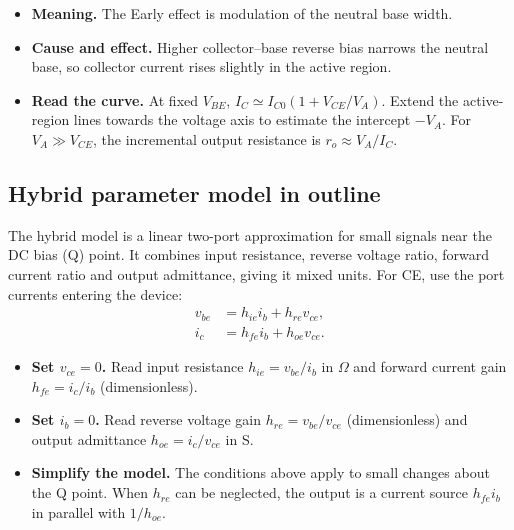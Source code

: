 \documentclass[12pt,a4paper]{article}
\begin{document}
\begin{tcolorbox}[tikzbox,title={CE output characteristics and the Early effect},unbreakable]
\centering
{}
\end{tcolorbox}

\begin{itemize}[leftmargin=*, itemsep=3pt, topsep=4pt]
  \item \textbf{Meaning.} The Early effect is modulation of the neutral base width.
  \item \textbf{Cause and effect.} Higher collector--base reverse bias narrows the neutral base, so collector current rises slightly in the active region.
  \item \textbf{Read the curve.} At fixed \(V_{BE}\), \(I_C\simeq I_{C0}(1+V_{CE}/V_A)\). Extend the active-region lines towards the voltage axis to estimate the intercept \(-V_A\). For \(V_A\gg V_{CE}\), the incremental output resistance is \(r_o\approx V_A/I_C\).
\end{itemize}

\subsection{Hybrid parameter model in outline}
The hybrid model is a linear two-port approximation for small signals near the DC bias (Q) point. It combines input resistance, reverse voltage ratio, forward current ratio and output admittance, giving it mixed units. For CE, use the port currents entering the device:
\[
\begin{aligned}
v_{be}&=h_{ie}i_b+h_{re}v_{ce},\\
i_c&=h_{fe}i_b+h_{oe}v_{ce}.
\end{aligned}
\]
\begin{itemize}[leftmargin=*, itemsep=3pt, topsep=4pt]
  \item \textbf{Set \(v_{ce}=0\).} Read input resistance \(h_{ie}=v_{be}/i_b\) in \(\Omega\) and forward current gain \(h_{fe}=i_c/i_b\) (dimensionless).
  \item \textbf{Set \(i_b=0\).} Read reverse voltage gain \(h_{re}=v_{be}/v_{ce}\) (dimensionless) and output admittance \(h_{oe}=i_c/v_{ce}\) in S.
  \item \textbf{Simplify the model.} The conditions above apply to small changes about the Q point. When \(h_{re}\) can be neglected, the output is a current source \(h_{fe}i_b\) in parallel with \(1/h_{oe}\).
\end{itemize}
\end{document}
